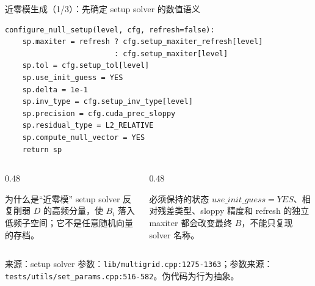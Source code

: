 \documentclass[UTF8,aspectratio=169,11pt]{ctexbeamer}
\newcommand{\source}[1]{\vspace{0.05em}\par{\raggedright\scriptsize\color{muted}来源：#1\par}}
\newcommand{\codepath}[1]{\nolinkurl{#1}}
\begin{document}
\begin{frame}[fragile,t]{近零模生成（1/3）：先确定 setup solver 的数值语义}
  \begin{lstlisting}[firstnumber=1]
configure_null_setup(level, cfg, refresh=false):
    sp.maxiter = refresh ? cfg.setup_maxiter_refresh[level]
                         : cfg.setup_maxiter[level]
    sp.tol = cfg.setup_tol[level]
    sp.use_init_guess = YES
    sp.delta = 1e-1
    sp.inv_type = cfg.setup_inv_type[level]
    sp.precision = cfg.cuda_prec_sloppy
    sp.residual_type = L2_RELATIVE
    sp.compute_null_vector = YES
    return sp
  \end{lstlisting}
  \vspace{0.08cm}
  \begin{columns}[T,totalwidth=\textwidth]
    \begin{column}{0.48\textwidth}
      \begin{block}{为什么是“近零模”}
        setup solver 反复削弱 \(D\) 的高频分量，使 \(B_i\) 落入低频子空间；它不是任意随机向量的存档。
      \end{block}
    \end{column}
    \begin{column}{0.48\textwidth}
      \begin{alertblock}{必须保持的状态}
        \(use\_init\_guess=YES\)、相对残差类型、sloppy 精度和 refresh 的独立 maxiter 都会改变最终 \(B\)，不能只复现 solver 名称。
      \end{alertblock}
    \end{column}
  \end{columns}
  \source{setup solver 参数：\codepath{lib/multigrid.cpp:1275-1363}；参数来源：\codepath{tests/utils/set_params.cpp:516-582}。伪代码为行为抽象。}
\end{frame}
\end{document}
